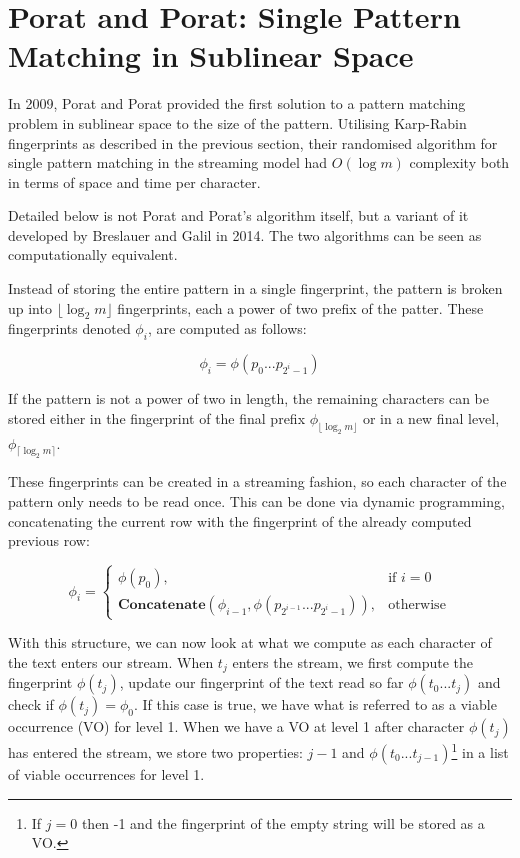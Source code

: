 \documentclass[ %
                    author={Dominic Joseph Moylett},
                    degree={MEng},
                     title={Dictionary Matching with Fingerprints},
                  subtitle={An Empirical Analysis},
                      type={Research},
                      year={2014} ]{dissertation}
\begin{document}
\section{Porat and Porat: Single Pattern Matching in Sublinear Space}
\label{sec:porat-porat}

In 2009, Porat and Porat\cite{5438620} provided the first solution to a pattern matching problem in sublinear space to the size of the pattern. Utilising Karp-Rabin fingerprints as described in the previous section, their randomised algorithm for single pattern matching in the streaming model had $O(\log m)$ complexity both in terms of space and time per character.

Detailed below is not Porat and Porat's algorithm itself, but a variant of it developed by Breslauer and Galil in 2014\cite{Breslauer:2014:RSS:2660854.2635814}. The two algorithms can be seen as computationally equivalent.

Instead of storing the entire pattern in a single fingerprint, the pattern is broken up into $\lfloor \log_2 m\rfloor$ fingerprints, each a power of two prefix of the patter. These fingerprints denoted $\phi_i$, are computed as follows:

$$\phi_i = \phi(p_0...p_{2^i-1})$$

If the pattern is not a power of two in length, the remaining characters can be stored either in the fingerprint of the final prefix $\phi_{\lfloor\log_2m\rfloor}$ or in a new final level, $\phi_{\lceil\log_2m\rceil}$.

These fingerprints can be created in a streaming fashion, so each character of the pattern only needs to be read once. This can be done via dynamic programming, concatenating the current row with the fingerprint of the already computed previous row:

\[
  \phi_i =
  \begin{cases}
    \phi(p_0),& \text{if } i = 0\\
    \textbf{Concatenate}(\phi_{i - 1}, \phi(p_{2^{i-1}}...p_{2^i-1})),& \text{otherwise}
  \end{cases}
\]

With this structure, we can now look at what we compute as each character of the text enters our stream. When $t_j$ enters the stream, we first compute the fingerprint $\phi(t_j)$, update our fingerprint of the text read so far $\phi(t_0...t_j)$ and check if $\phi(t_j) = \phi_0$. If this case is true, we have what is referred to as a viable occurrence (VO) for level 1. When we have a VO at level 1 after character $\phi(t_j)$ has entered the stream, we store two properties: $j-1$ and $\phi(t_0...t_{j-1})$\footnote{If $j = 0$ then -1 and the fingerprint of the empty string will be stored as a VO.} in a list of viable occurrences for level 1.
\end{document}
